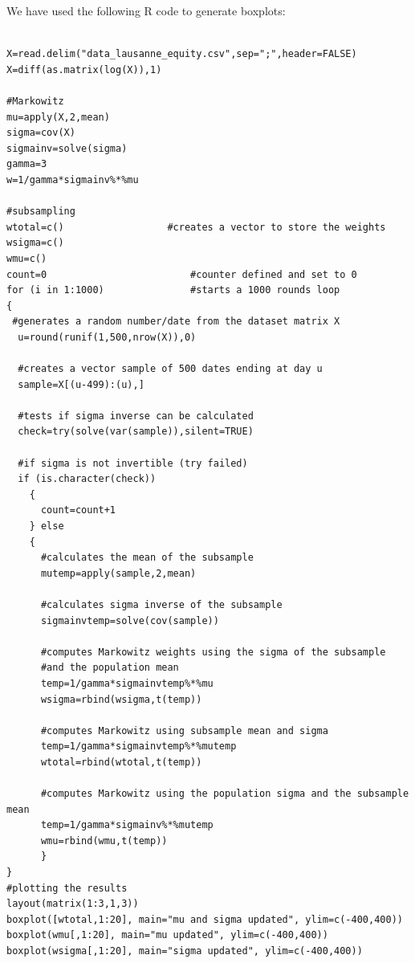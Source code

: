 We have used the following R code to generate boxplots: 
\begin{verbatim}

X=read.delim("data_lausanne_equity.csv",sep=";",header=FALSE)
X=diff(as.matrix(log(X)),1)

#Markowitz
mu=apply(X,2,mean)
sigma=cov(X)
sigmainv=solve(sigma)
gamma=3
w=1/gamma*sigmainv%*%mu

#subsampling
wtotal=c()            		#creates a vector to store the weights
wsigma=c()
wmu=c()
count=0                 		#counter defined and set to 0
for (i in 1:1000)        		#starts a 1000 rounds loop
{
 #generates a random number/date from the dataset matrix X 
  u=round(runif(1,500,nrow(X)),0)               	
  
  #creates a vector sample of 500 dates ending at day u					
  sample=X[(u-499):(u),]           
  
  #tests if sigma inverse can be calculated            		
  check=try(solve(var(sample)),silent=TRUE) 
 
  #if sigma is not invertible (try failed)   
  if (is.character(check))                     			
    {
      count=count+1            
    } else                                      			
    { 
      #calculates the mean of the subsample
      mutemp=apply(sample,2,mean)     
   
      #calculates sigma inverse of the subsample
      sigmainvtemp=solve(cov(sample))    

      #computes Markowitz weights using the sigma of the subsample 
      #and the population mean
      temp=1/gamma*sigmainvtemp%*%mu        
      wsigma=rbind(wsigma,t(temp))         
      
      #computes Markowitz using subsample mean and sigma  	 
      temp=1/gamma*sigmainvtemp%*%mutemp        
      wtotal=rbind(wtotal,t(temp))     
      
      #computes Markowitz using the population sigma and the subsample mean      		 
      temp=1/gamma*sigmainv%*%mutemp            
      wmu=rbind(wmu,t(temp))                   		 
      }
}
#plotting the results
layout(matrix(1:3,1,3))
boxplot([wtotal,1:20], main="mu and sigma updated", ylim=c(-400,400))
boxplot(wmu[,1:20], main="mu updated", ylim=c(-400,400))
boxplot(wsigma[,1:20], main="sigma updated", ylim=c(-400,400))

\end{verbatim}
\newpage
